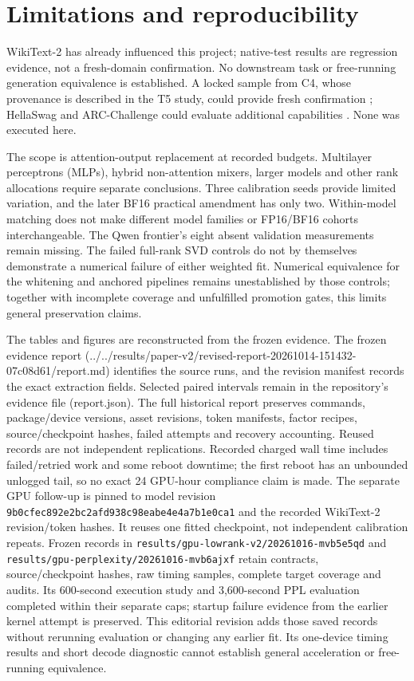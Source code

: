 \documentclass[conference]{IEEEtran}
\begin{document}
\section{Limitations and reproducibility}
WikiText-2 has already influenced this project; native-test results are regression evidence, not a fresh-domain confirmation. No downstream task or free-running generation equivalence is established. A locked sample from C4, whose provenance is described in the T5 study, could provide fresh confirmation \cite{raffel2020t5}; HellaSwag and ARC-Challenge could evaluate additional capabilities \cite{zellers2019hellaswag} \cite{clark2018arc}. None was executed here.\par\smallskip
The scope is attention-output replacement at recorded budgets. Multilayer perceptrons (MLPs), hybrid non-attention mixers, larger models and other rank allocations require separate conclusions. Three calibration seeds provide limited variation, and the later BF16 practical amendment has only two. Within-model matching does not make different model families or FP16/BF16 cohorts interchangeable. The Qwen frontier's eight absent validation measurements remain missing. The failed full-rank SVD controls do not by themselves demonstrate a numerical failure of either weighted fit. Numerical equivalence for the whitening and anchored pipelines remains unestablished by those controls; together with incomplete coverage and unfulfilled promotion gates, this limits general preservation claims.\par\smallskip
The tables and figures are reconstructed from the frozen evidence. The frozen evidence report (../../results/paper-v2/revised-report-20261014-151432-07c08d61/report.md) identifies the source runs, and the revision manifest records the exact extraction fields. Selected paired intervals remain in the repository's evidence file (report.json). The full historical report preserves commands, package/device versions, asset revisions, token manifests, factor recipes, source/checkpoint hashes, failed attempts and recovery accounting. Reused records are not independent replications. Recorded charged wall time includes failed/retried work and some reboot downtime; the first reboot has an unbounded unlogged tail, so no exact 24 GPU-hour compliance claim is made. The separate GPU follow-up is pinned to model revision \nolinkurl{9b0cfec892e2bc2afd938c98eabe4e4a7b1e0ca1} and the recorded WikiText-2 revision/token hashes. It reuses one fitted checkpoint, not independent calibration repeats. Frozen records in \nolinkurl{results/gpu-lowrank-v2/20261016-mvb5e5qd} and \nolinkurl{results/gpu-perplexity/20261016-mvb6ajxf} retain contracts, source/checkpoint hashes, raw timing samples, complete target coverage and audits. Its 600-second execution study and 3,600-second PPL evaluation completed within their separate caps; startup failure evidence from the earlier kernel attempt is preserved. This editorial revision adds those saved records without rerunning evaluation or changing any earlier fit. Its one-device timing results and short decode diagnostic cannot establish general acceleration or free-running equivalence.\par\smallskip
\end{document}

